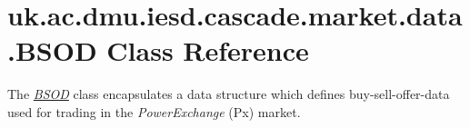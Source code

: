 \hypertarget{classuk_1_1ac_1_1dmu_1_1iesd_1_1cascade_1_1market_1_1data_1_1_b_s_o_d}{\section{uk.\-ac.\-dmu.\-iesd.\-cascade.\-market.\-data.\-B\-S\-O\-D Class Reference}
\label{classuk_1_1ac_1_1dmu_1_1iesd_1_1cascade_1_1market_1_1data_1_1_b_s_o_d}
}


The {\itshape \hyperlink{classuk_1_1ac_1_1dmu_1_1iesd_1_1cascade_1_1market_1_1data_1_1_b_s_o_d}{B\-S\-O\-D}} class encapsulates a data structure which defines buy-\/sell-\/offer-\/data used for trading in the {\itshape Power\-Exchange} (Px) market.  


